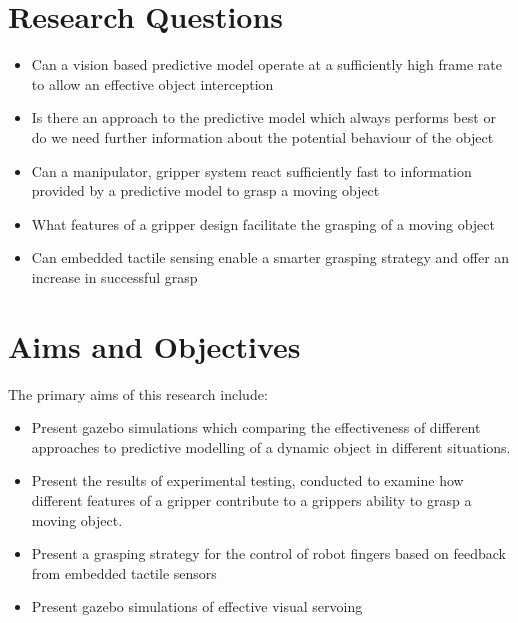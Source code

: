 \section{Research Questions}
\begin{itemize}
\item Can a vision based predictive model operate at a sufficiently high frame rate to allow an effective object interception %

\item Is there an approach to the predictive model which always performs best or do we need further information about the potential behaviour of the object %

\item Can a manipulator, gripper system react sufficiently fast to information provided by a predictive model to grasp a moving object %

\item What features of a gripper design facilitate the grasping of a moving object %

\item Can embedded tactile sensing enable a smarter grasping strategy and offer an increase in successful grasp %
\end{itemize}

\section{Aims and Objectives}
The primary aims of this research include:

\begin{itemize}
\item Present gazebo simulations which comparing the effectiveness of different approaches to predictive modelling of a dynamic object in different situations.
\item Present the results of experimental testing, conducted to examine how different features of a gripper contribute to a grippers ability to grasp a moving object.
\item Present a grasping strategy for the control of robot fingers based on feedback from embedded tactile sensors
\item Present gazebo simulations of effective visual servoing 
\end{itemize}

